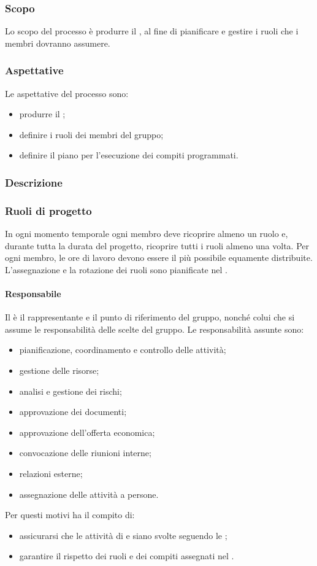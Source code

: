 \subsubsection{Scopo}
Lo scopo del processo è produrre il \PPdoc , al fine di pianificare e gestire i ruoli che i membri dovranno assumere.
\subsubsection{Aspettative}
Le aspettative del processo sono:
 \begin{itemize}
  \item produrre il \PPdoc ;
  \item definire i ruoli dei membri del gruppo;
  \item definire il piano per l'esecuzione dei compiti programmati.
 \end{itemize}
\subsubsection{Descrizione}

\subsubsection{Ruoli di progetto}
 In ogni momento temporale ogni membro deve ricoprire almeno un ruolo e, durante tutta la durata del progetto, ricoprire tutti i ruoli almeno una volta. Per ogni membro, le ore di lavoro devono essere il più possibile equamente distribuite. L'assegnazione e la rotazione dei ruoli sono pianificate nel \PPdocRR.
 \paragraph{Responsabile}
 Il \RESP{} è il rappresentante e il punto di riferimento del gruppo, nonché colui che si assume le responsabilità delle scelte del gruppo.
 Le responsabilità assunte sono:
 \begin{itemize}
  \item pianificazione, coordinamento e controllo delle attività;
  \item gestione delle risorse;
  \item analisi e gestione dei rischi;
  \item approvazione dei documenti;
  \item approvazione dell'offerta economica;
  \item convocazione delle riunioni interne;
  \item relazioni esterne;
  \item assegnazione delle attività a persone.
\end{itemize}
Per questi motivi ha il compito di:
\begin{itemize}
	\item assicurarsi che le attività di  e  siano svolte seguendo le \NPdoc;
	\item garantire il rispetto dei ruoli e dei compiti assegnati nel \PPdoc.
\end{itemize}
